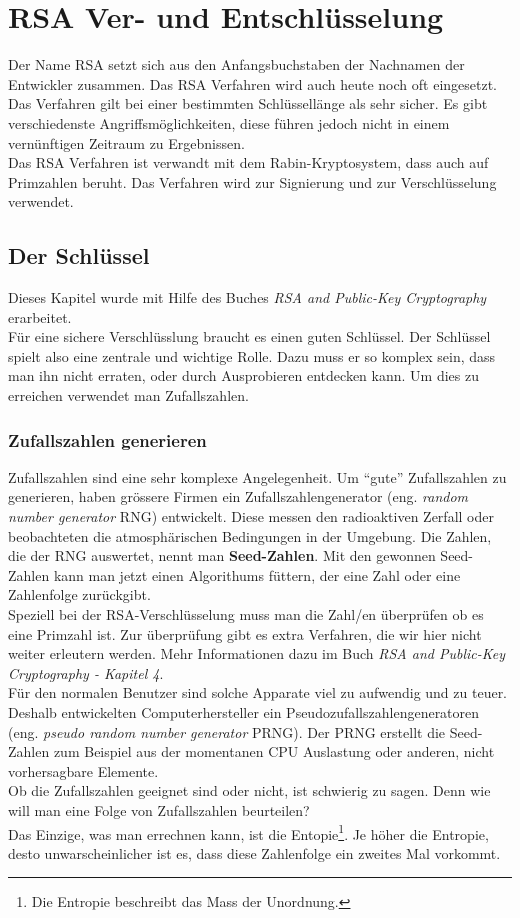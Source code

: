 \newpage
\section{RSA Ver- und Entschlüsselung}
Der Name RSA setzt sich aus den Anfangsbuchstaben der Nachnamen der Entwickler zusammen. Das RSA Verfahren wird auch heute noch oft eingesetzt. Das Verfahren gilt bei einer bestimmten Schlüssellänge als sehr sicher. Es gibt verschiedenste Angriffsmöglichkeiten, diese führen jedoch nicht in einem vernünftigen Zeitraum zu Ergebnissen.\\
Das RSA Verfahren ist verwandt mit dem Rabin-Kryptosystem, dass auch auf Primzahlen beruht. Das Verfahren wird zur Signierung und zur Verschlüsselung verwendet. %

\subsection{Der Schlüssel}
Dieses Kapitel wurde mit Hilfe des Buches \textit{RSA and Public-Key Cryptography} erarbeitet.\\[2ex]
%
Für eine sichere Verschlüsslung braucht es einen guten Schlüssel. Der Schlüssel spielt also eine zentrale und wichtige Rolle. Dazu muss er so komplex sein, dass man ihn nicht erraten, oder durch Ausprobieren entdecken kann. Um dies zu erreichen verwendet man Zufallszahlen.
%
\subsubsection{Zufallszahlen generieren}
Zufallszahlen sind eine sehr komplexe Angelegenheit. Um ``gute'' Zufallszahlen zu generieren, haben grössere Firmen ein Zufallszahlengenerator (eng. \textit{random number generator} RNG) entwickelt. Diese messen den radioaktiven Zerfall oder beobachteten die atmosphärischen Bedingungen in der Umgebung. Die Zahlen, die der RNG auswertet, nennt man \textbf{Seed-Zahlen}. Mit den gewonnen Seed-Zahlen kann man jetzt einen Algorithums füttern, der eine Zahl oder eine Zahlenfolge zurückgibt.\\
Speziell bei der RSA-Verschlüsselung muss man die Zahl/en überprüfen ob es eine Primzahl ist. Zur überprüfung gibt es extra Verfahren, die wir hier nicht weiter erleutern werden. Mehr Informationen dazu im Buch \textit{RSA and Public-Key Cryptography - Kapitel 4}.\\
%
Für den normalen Benutzer sind solche Apparate viel zu aufwendig und zu teuer. Deshalb entwickelten Computerhersteller ein Pseudozufallszahlengeneratoren (eng. \textit{pseudo random number generator} PRNG). Der PRNG erstellt die Seed-Zahlen zum Beispiel aus der momentanen CPU Auslastung oder anderen, nicht vorhersagbare Elemente.\\
Ob die Zufallszahlen geeignet sind oder nicht, ist schwierig zu sagen. Denn wie will man eine Folge von Zufallszahlen beurteilen?\\
Das Einzige, was man errechnen kann, ist die Entopie\footnote{Die Entropie beschreibt das Mass der Unordnung.}. Je höher die Entropie, desto unwarscheinlicher ist es, dass diese Zahlenfolge ein zweites Mal vorkommt.

